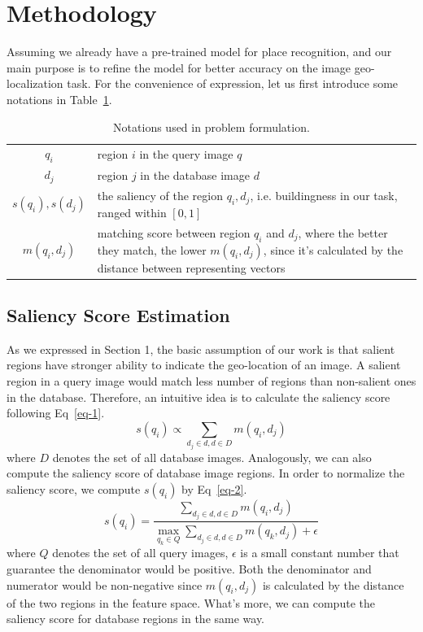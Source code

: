 \section{Methodology}
Assuming we already have a pre-trained model for place recognition, and our main purpose is to refine the model for better accuracy on the image geo-localization task. For the convenience of expression, let us first introduce some notations in Table~\ref{table:notations}. 
\begin{table}
\begin{center}
\begin{tabular}{|c|p{}|}
\hline
$q_i$ & region $i$ in the query image $q$\\[0.2cm]
$d_j$ & region $j$ in the database image $d$\\[0.2cm]
$s(q_i), s(d_j)$ & the saliency of the region $q_i, d_j$, i.e. buildingness in our
task, ranged within $[0,1]$ \\[0.2cm]
$m(q_i, d_j)$ & matching score between region $q_i$ and $d_j$, where the better they match, the lower $m(q_i,d_j)$, since it's calculated by the distance between representing vectors\\[0.2cm]
\hline
\end{tabular}
\end{center}
\caption{Notations used in problem formulation.}
\label{table:notations}
\end{table}
\subsection{Saliency Score Estimation}
\par
As we expressed in Section 1, the basic assumption of our work is that salient regions have stronger ability to indicate the geo-location of an image. A salient region in a query image would match less number of regions than non-salient ones in the database. Therefore, an intuitive idea is to calculate the saliency score following Eq~\eqref{eq-1}.
\begin{equation}
s(q_i) \propto \sum_{d_j \in d, d \in D} m(q_i, d_j)
\label{eq-1}
\end{equation}
where $D$ denotes the set of all database images. Analogously, we can also compute the saliency score of database image regions. In order to normalize the saliency score, we compute $s(q_i)$ by Eq~\eqref{eq-2}.
\begin{equation}
s(q_i) = \frac{\sum_{d_j \in d, d \in D} m(q_i, d_j)}{\max_{q_k \in Q}\sum_{d_j \in d, d \in D} m(q_k, d_j) + \epsilon}
\label{eq-2}
\end{equation}
where $Q$ denotes the set of all query images, $\epsilon$ is a small constant number that guarantee the denominator would be positive. Both the denominator and numerator would be non-negative since $m(q_i, d_j)$ is calculated by the distance of the two regions in the feature space. What's more, we can compute the saliency score for database regions in the same way. 
